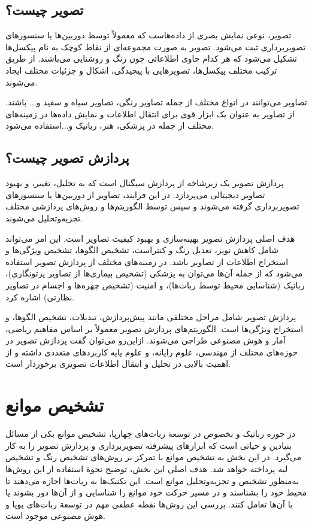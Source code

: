\subsection{تصویر چیست؟}

تصویر، نوعی نمایش بصری از داده‌هاست که معمولاً توسط دوربین‌ها یا سنسورهای تصویربرداری ثبت می‌شود. تصویر به صورت مجموعه‌ای از نقاط کوچک به نام پیکسل‌ها تشکیل می‌شود که هر کدام حاوی اطلاعاتی چون رنگ و روشنایی می‌باشند. از طریق ترکیب مختلف پیکسل‌ها، تصویرهایی با پیچیدگی، اشکال و جزئیات مختلف ایجاد می‌شوند.

تصاویر می‌توانند در انواع مختلف از جمله تصاویر رنگی، تصاویر سیاه و سفید و... باشند. از تصاویر به عنوان یک ابزار قوی برای انتقال اطلاعات و نمایش داده‌ها در زمینه‌های مختلف از جمله در پزشکی، هنر، رباتیک و...استفاده می‌شود.
\subsection{پردازش تصویر چیست؟}

پردازش تصویر یک زیرشاخه از پردازش سیگنال است که به تحلیل، تغییر، و بهبود تصاویر دیجیتالی می‌پردازد. در این فرایند، تصاویر از دوربین‌ها یا سنسورهای تصویربرداری گرفته می‌شوند و سپس توسط الگوریتم‌ها و روش‌های پردازشی مختلف تجزیه‌وتحلیل می‌شوند.

هدف اصلی پردازش تصویر بهینه‌سازی و بهبود کیفیت تصاویر است. این امر می‌تواند شامل کاهش نویز، تعدیل رنگ و کنتراست، تشخیص الگوها، تشخیص ویژگی‌ها و استخراج اطلاعات از تصاویر باشد. در زمینه‌های مختلف از پردازش تصویر استفاده می‌شود که از جمله آن‌ها می‌توان به پزشکی (تشخیص بیماری‌ها از تصاویر پرتونگاری)، رباتیک (شناسایی محیط توسط ربات‌ها)، و امنیت (تشخیص چهره‌ها و اجسام در تصاویر نظارتی) اشاره کرد.

پردازش تصویر شامل مراحل مختلفی مانند پیش‌پردازش، تبدیلات، تشخیص الگوها، و استخراج ویژگی‌ها است. الگوریتم‌های پردازش تصویر معمولاً بر اساس مفاهیم ریاضی، آمار و هوش مصنوعی طراحی می‌شوند. ازاین‌رو می‌توان گفت پردازش تصویر در حوزه‌های مختلف از مهندسی، علوم رایانه، و علوم پایه کاربردهای متعددی داشته و از اهمیت بالایی در تحلیل و انتقال اطلاعات تصویری برخوردار است.
\newpage
\section{تشخیص موانع}
در حوزه رباتیک و بخصوص در توسعة ربات‌های چهارپا، تشخیص موانع یکی از مسائل بنیادین و حیاتی است که ابزارهای پیشرفته تصویربرداری و پردازش تصویر را به کار می‌گیرد. در این بخش به تشخیص موانع با تمرکز بر روش‌های تشخیص رنگ و تشخیص لبه پرداخته خواهد شد. هدف اصلی این بخش، توضیح نحوة استفاده از این روش‌ها به‌منظور تشخیص و تجزیه‌وتحلیل موانع است. این تکنیک‌ها به ربات‌ها اجازه می‌دهند تا محیط خود را بشناسند و در مسیر حرکت خود موانع را شناسایی و از آن‌ها دور بشوند یا با آن‌ها تعامل کنند. بررسی این روش‌ها نقطه عطفی مهم در توسعة ربات‌های پویا و هوش مصنوعی موجود است.

